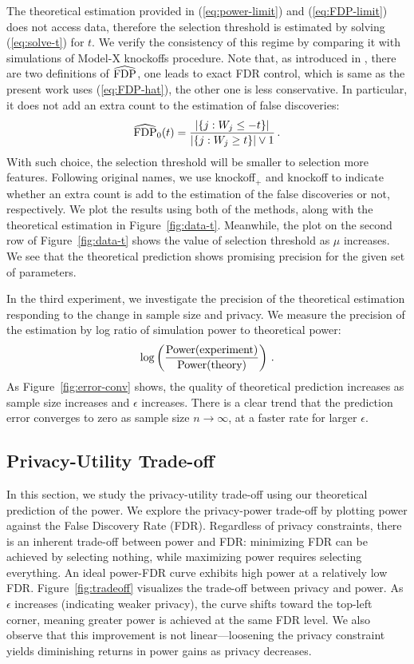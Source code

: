 \documentclass[11pt]{article}
\newcommand{\FDP}{{\rm FDP}}
\newcommand{\Power}{{\rm Power}}
\begin{document}
The theoretical estimation provided in (\ref{eq:power-limit}) and (\ref{eq:FDP-limit}) does not access data, therefore the selection threshold is estimated by solving (\ref{eq:solve-t}) for $t$. We verify the consistency of this regime by comparing it with simulations of Model-X knockoffs procedure. Note that, as introduced in \cite{candes2017panning}, there are two definitions of $\widehat{\FDP}$, one leads to exact FDR control, which is same as the present work uses (\ref{eq:FDP-hat}), the other one is less conservative. In particular, it does not add an extra count to the estimation of false discoveries:
\begin{equation}\label{eq:FDP-hat0}
    \widehat{\FDP}_0(t) = \frac{|\{j:W_j\leq -t\}|}{|\{j:W_j\geq t\}|\vee 1} \,.
\end{equation}
With such choice, the selection threshold will be smaller to selection more features. Following original names, we use knockoff$_+$ and knockoff to indicate whether an extra count is add to the estimation of the false discoveries or not, respectively. We plot the results using both of the methods, along with the theoretical estimation in Figure~\ref{fig:data-t}. Meanwhile, the plot on the second row of Figure~\ref{fig:data-t} shows the value of selection threshold as $\mu$ increases. We see that the theoretical prediction shows promising precision for the given set of parameters.  

In the third experiment, we investigate the precision of the theoretical estimation responding to the change in sample size and privacy. We measure the precision of the estimation by log ratio of simulation power to theoretical power:
\[
\log\left(\frac{\Power(\text{experiment})}{\Power(\text{theory})}\right)\,.
\]
As Figure~\ref{fig:error-conv} shows, the quality of theoretical prediction increases as sample size increases and $\epsilon$ increases. There is a clear trend that the prediction error converges to zero as sample size $n\to\infty$, at a faster rate for larger $\epsilon$.

\subsection{Privacy-Utility Trade-off}\label{sec:privacy-utility-tradeoff}
In this section, we study the privacy-utility trade-off using our theoretical prediction of the power. We explore the privacy-power trade-off by plotting power against the False Discovery Rate (FDR). Regardless of privacy constraints, there is an inherent trade-off between power and FDR: minimizing FDR can be achieved by selecting nothing, while maximizing power requires selecting everything. An ideal power-FDR curve exhibits high power at a relatively low FDR. Figure~\ref{fig:tradeoff} visualizes the trade-off between privacy and power. As $\epsilon$ increases (indicating weaker privacy), the curve shifts toward the top-left corner, meaning greater power is achieved at the same FDR level. We also observe that this improvement is not linear—loosening the privacy constraint yields diminishing returns in power gains as privacy decreases.
\end{document}
